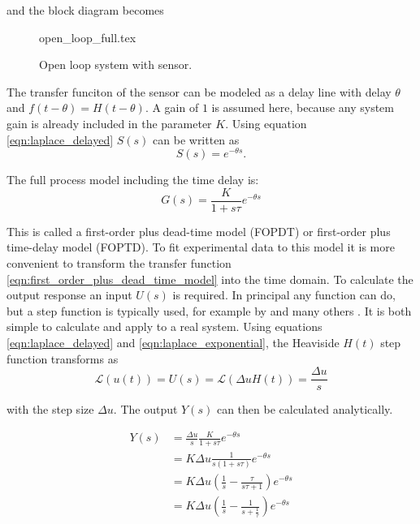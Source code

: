 and the block diagram becomes

\begin{figure}[ht]
    \centering
    {open_loop_full.tex}
    \caption{Open loop system with sensor.}
\end{figure}

The transfer funciton of the sensor can be modeled as a delay line with delay $\theta$ and $f(t-\theta) = H(t-\theta)$. A gain of $1$ is assumed here, because any system gain is already included in the parameter $K$. Using equation \ref{eqn:laplace_delayed} $S(s)$ can be written as
\begin{equation}
    S(s) = e^{-\theta s} .
\end{equation}

The full process model including the time delay is:
\begin{equation}
    G(s) = \frac{K}{1 + s\tau} e^{-\theta s} \label{eqn:first_order_plus_dead_time_model}
\end{equation}

This is called a first-order plus dead-time model (FOPDT) or first-order plus time-delay model (FOPTD). To fit experimental data to this model it is more convenient to transform the transfer function \ref{eqn:first_order_plus_dead_time_model} into the time domain. To calculate the output response an input $U(s)$ is required. In principal any function can do, but a step function is typically used, for example by \citeauthor{ziegler_nichols} \cite{ziegler_nichols} and many others \cite{tuning_rules,pessen_integral,simc,smic2,pid_controllers_for_time_delay_systems,pi_stabilization_of_fopdt_systems, pid_basics}. It is both simple to calculate and apply to a real system. Using equations \ref{eqn:laplace_delayed} and \ref{eqn:laplace_exponential}, the Heaviside $H(t)$ step function transforms as
\begin{equation}
    \mathscr{L} \left(u(t) \right) = U(s) = \mathscr{L} \left( \Delta u H(t) \right) = \frac{\Delta u}{s}
\end{equation}

with the step size $\Delta u$. The output $Y(s)$ can then be calculated analytically.

\begin{align}
    Y(s) &= \frac{\Delta u}{s} \frac{K}{1 + s\tau} e^{-\theta s} \nonumber\\
    &=  K \Delta u \frac{1}{s (1 + s\tau)} e^{-\theta s} \nonumber\\
    &= K \Delta u \left(\frac{1}{s} - \frac{\tau}{s\tau+1} \right) e^{-\theta s} \nonumber\\
    &= K \Delta u \left(\frac{1}{s} - \frac{1}{s+\frac{1}{\tau}} \right) e^{-\theta s}
\end{align}


